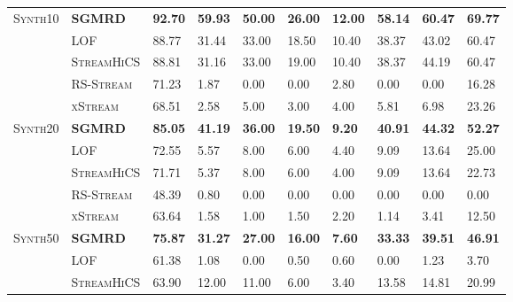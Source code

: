 \begin{table}[]
\begin{tabularx}{\textwidth}{@{}XXllllllll@{}}
		\textsc{Synth10}   & \textbf{\gls{SGMRD}} & \textbf{92.70} & \textbf{59.93} & \textbf{50.00} & \textbf{26.00} & \textbf{12.00} & \textbf{58.14} & \textbf{60.47} & \textbf{69.77} \\
		& \textsc{\gls{LOF}}      & 88.77          & 31.44          & 33.00          & 18.50          & 10.40          & 38.37          & 43.02          & 60.47          \\
		& \textsc{Stream\gls{HiCS}}     & 88.81          & 31.16          & 33.00          & 19.00          & 10.40          & 38.37          & 44.19          & 60.47          \\
		& \textsc{\gls{RS-Stream}}      & 71.23          & 1.87           & 0.00           & 0.00           & 2.80           & 0.00           & 0.00           & 16.28          \\
		& \textsc{xStream}        & 68.51          & 2.58           & 5.00           & 3.00           & 4.00           & 5.81           & 6.98           & 23.26          \\ \midrule
		\textsc{Synth20}   & \textbf{\gls{SGMRD}} & \textbf{85.05} & \textbf{41.19} & \textbf{36.00} & \textbf{19.50} & \textbf{9.20}  & \textbf{40.91} & \textbf{44.32} & \textbf{52.27} \\
		& \textsc{\gls{LOF}}      & 72.55          & 5.57           & 8.00           & 6.00           & 4.40           & 9.09           & 13.64          & 25.00          \\
		& \textsc{Stream\gls{HiCS}}     & 71.71          & 5.37           & 8.00           & 6.00           & 4.00           & 9.09           & 13.64          & 22.73          \\
		& \textsc{\gls{RS-Stream}}      & 48.39          & 0.80           & 0.00           & 0.00           & 0.00           & 0.00           & 0.00           & 0.00           \\
		& \textsc{xStream}        & 63.64          & 1.58           & 1.00           & 1.50           & 2.20           & 1.14           & 3.41           & 12.50          \\ \midrule
		\textsc{Synth50}   & \textbf{\gls{SGMRD}} & \textbf{75.87} & \textbf{31.27} & \textbf{27.00} & \textbf{16.00} & \textbf{7.60}  & \textbf{33.33} & \textbf{39.51} & \textbf{46.91} \\
		& \textsc{\gls{LOF}}      & 61.38          & 1.08           & 0.00           & 0.50           & 0.60           & 0.00           & 1.23           & 3.70           \\
		& \textsc{Stream\gls{HiCS}}     & 63.90          & 12.00          & 11.00          & 6.00           & 3.40           & 13.58          & 14.81          & 20.99          \\

\end{tabularx}
\end{table}

